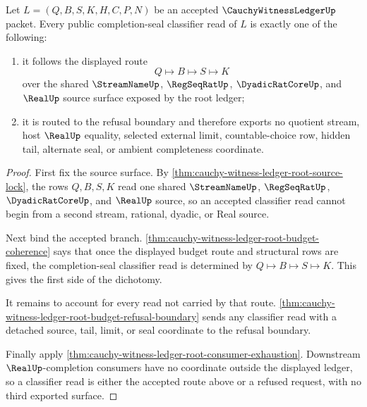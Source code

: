 \begin{theorem}
\label{thm:cauchy-witness-ledger-root-budget-classifier-dichotomy}
Let $L=(Q,B,S,K,H,C,P,N)$ be an accepted $\CauchyWitnessLedgerUp$ packet. Every public completion-seal classifier read of $L$ is exactly one of the following:
\begin{enumerate}
\item it follows the displayed route
$$
Q \longmapsto B \longmapsto S \longmapsto K
$$
over the shared $\StreamNameUp$, $\RegSeqRatUp$, $\DyadicRatCoreUp$, and $\RealUp$ source surface exposed by the root ledger;
\item it is routed to the refusal boundary and therefore exports no quotient stream, host $\RealUp$ equality, selected external limit, countable-choice row, hidden tail, alternate seal, or ambient completeness coordinate.
\end{enumerate}
\end{theorem}
\begin{proof}
First fix the source surface. By \autoref{thm:cauchy-witness-ledger-root-source-lock}, the rows $Q,B,S,K$ read one shared $\StreamNameUp$, $\RegSeqRatUp$, $\DyadicRatCoreUp$, and $\RealUp$ source, so an accepted classifier read cannot begin from a second stream, rational, dyadic, or Real source.

Next bind the accepted branch. \autoref{thm:cauchy-witness-ledger-root-budget-coherence} says that once the displayed budget route and structural rows are fixed, the completion-seal classifier read is determined by $Q \longmapsto B \longmapsto S \longmapsto K$. This gives the first side of the dichotomy.

It remains to account for every read not carried by that route. \autoref{thm:cauchy-witness-ledger-root-budget-refusal-boundary} sends any classifier read with a detached source, tail, limit, or seal coordinate to the refusal boundary.

Finally apply \autoref{thm:cauchy-witness-ledger-root-consumer-exhaustion}. Downstream $\RealUp$-completion consumers have no coordinate outside the displayed ledger, so a classifier read is either the accepted route above or a refused request, with no third exported surface.
\end{proof}

